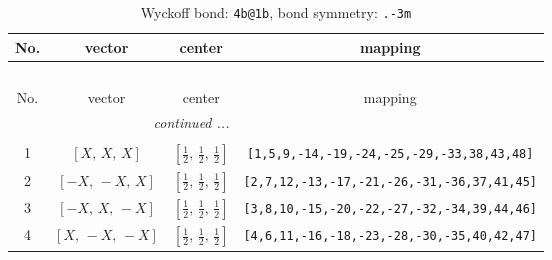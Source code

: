 \documentclass[fleqn,8pt]{jsarticle}
\begin{document}
\renewcommand{\arraystretch}{1.2}
\begin{longtable}{cccc}
\caption{Wyckoff bond: {\tt 4b@1b}, bond symmetry: {\tt .-3m}}
 \\
 \hline \hline
No. & vector & center & mapping \\ \hline \endfirsthead

\multicolumn{3}{l}{\tablename\ \thetable{}} \\
 \hline \hline
No. & vector & center & mapping \\ \hline \endhead

 \hline \hline
\multicolumn{3}{r}{\footnotesize\it continued ...} \\ \endfoot

 \hline \hline
\multicolumn{3}{r}{} \\ \endlastfoot

1 & $\left[ X,\, X,\, X \right]$ & $\left[ \frac{1}{2},\, \frac{1}{2},\, \frac{1}{2} \right]$ & {\tt [1,5,9,-14,-19,-24,-25,-29,-33,38,43,48]} \\ \hline
2 & $\left[ - X,\, - X,\, X \right]$ & $\left[ \frac{1}{2},\, \frac{1}{2},\, \frac{1}{2} \right]$ & {\tt [2,7,12,-13,-17,-21,-26,-31,-36,37,41,45]} \\ \hline
3 & $\left[ - X,\, X,\, - X \right]$ & $\left[ \frac{1}{2},\, \frac{1}{2},\, \frac{1}{2} \right]$ & {\tt [3,8,10,-15,-20,-22,-27,-32,-34,39,44,46]} \\ \hline
4 & $\left[ X,\, - X,\, - X \right]$ & $\left[ \frac{1}{2},\, \frac{1}{2},\, \frac{1}{2} \right]$ & {\tt [4,6,11,-16,-18,-23,-28,-30,-35,40,42,47]} \\
\end{longtable}
\renewcommand{\arraystretch}{1.2}
\end{document}
